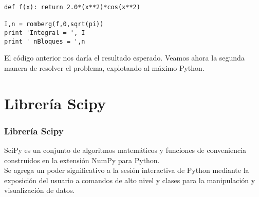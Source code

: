 \begin{frame}[fragile]
\begin{lstlisting}
def f(x): return 2.0*(x**2)*cos(x**2)

I,n = romberg(f,0,sqrt(pi))
print 'Integral = ', I
print ' nBloques = ',n
\end{lstlisting}
El c\'{o}digo anterior nos dar\'{i}a el resultado esperado. Veamos ahora la segunda manera de resolver el problema, explotando al m\'{a}ximo Python.
\end{frame}
\section{Librer\'{i}a Scipy}
\begin{frame}
\frametitle{Librer\'{i}a Scipy}
SciPy es un conjunto de algoritmos matem\'{a}ticos y funciones de conveniencia construidos en la extensi\'{o}n NumPy para Python.
\\
\bigskip
Se agrega un poder significativo a la sesi\'{o}n interactiva de Python mediante la exposici\'{o}n del usuario a comandos de alto nivel y clases para la manipulaci\'{o}n y visualizaci\'{o}n de datos.
\end{frame}
